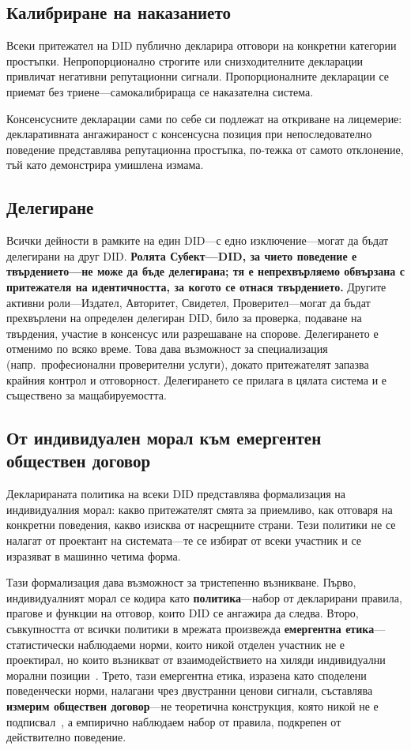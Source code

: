 \documentclass[11pt,a4paper,twocolumn]{article}
\begin{document}
\subsection{Калибриране на наказанието}

Всеки притежател на DID публично декларира отговори на конкретни категории простъпки. Непропорционално строгите или снизходителните декларации привличат негативни репутационни сигнали. Пропорционалните декларации се приемат без триене---самокалибрираща се наказателна система.

Консенсусните декларации сами по себе си подлежат на откриване на лицемерие: декларативната ангажираност с консенсусна позиция при непоследователно поведение представлява репутационна простъпка, по-тежка от самото отклонение, тъй като демонстрира умишлена измама.

\subsection{Делегиране}

Всички дейности в рамките на един DID---с едно изключение---могат да бъдат делегирани на друг DID. \textbf{Ролята Субект---DID, за чието поведение е твърдението---не може да бъде делегирана; тя е непрехвърляемо обвързана с притежателя на идентичността, за когото се отнася твърдението.} Другите активни роли---Издател, Авторитет, Свидетел, Проверител---могат да бъдат прехвърлени на определен делегиран DID, било за проверка, подаване на твърдения, участие в консенсус или разрешаване на спорове. Делегирането е отменимо по всяко време. Това дава възможност за специализация (напр.\ професионални проверителни услуги), докато притежателят запазва крайния контрол и отговорност. Делегирането се прилага в цялата система и е съществено за мащабируемостта.

\subsection{От индивидуален морал към емергентен обществен договор}

Декларираната политика на всеки DID представлява формализация на индивидуалния морал: какво притежателят смята за приемливо, как отговаря на конкретни поведения, какво изисква от насрещните страни. Тези политики не се налагат от проектант на системата---те се избират от всеки участник и се изразяват в машинно четима форма.

Тази формализация дава възможност за тристепенно възникване. Първо, индивидуалният морал се кодира като \textbf{политика}---набор от декларирани правила, прагове и функции на отговор, които DID се ангажира да следва. Второ, съвкупността от всички политики в мрежата произвежда \textbf{емергентна етика}---статистически наблюдаеми норми, които никой отделен участник не е проектирал, но които възникват от взаимодействието на хиляди индивидуални морални позиции~\cite{durkheim1893}. Трето, тази емергентна етика, изразена като споделени поведенчески норми, налагани чрез двустранни ценови сигнали, съставлява \textbf{измерим обществен договор}---не теоретична конструкция, която никой не е подписвал~\cite{rawls1971}, а емпирично наблюдаем набор от правила, подкрепен от действително поведение.
\end{document}
